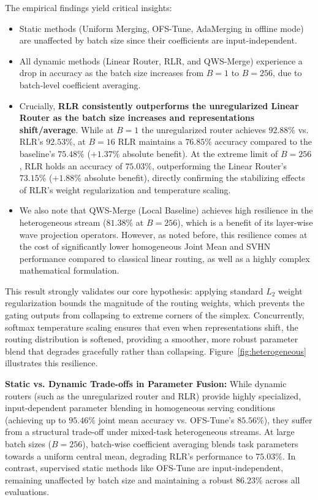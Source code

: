 The empirical findings yield critical insights:
\begin{itemize}
    \item Static methods (Uniform Merging, OFS-Tune, AdaMerging in offline mode) are unaffected by batch size since their coefficients are input-independent.
    \item All dynamic methods (Linear Router, RLR, and QWS-Merge) experience a drop in accuracy as the batch size increases from $B=1$ to $B=256$, due to batch-level coefficient averaging.
    \item Crucially, \textbf{RLR consistently outperforms the unregularized Linear Router as the batch size increases and representations shift/average}. While at $B=1$ the unregularized router achieves $92.88\%$ vs. RLR's $92.53\%$, at $B=16$ RLR maintains a $76.85\%$ accuracy compared to the baseline's $75.48\%$ ($+1.37\%$ absolute benefit). At the extreme limit of $B=256$, RLR holds an accuracy of $75.03\%$, outperforming the Linear Router's $73.15\%$ ($+1.88\%$ absolute benefit), directly confirming the stabilizing effects of RLR's weight regularization and temperature scaling.
    \item We also note that QWS-Merge (Local Baseline) achieves high resilience in the heterogeneous stream ($81.38\%$ at $B=256$), which is a benefit of its layer-wise wave projection operators. However, as noted before, this resilience comes at the cost of significantly lower homogeneous Joint Mean and SVHN performance compared to classical linear routing, as well as a highly complex mathematical formulation.
\end{itemize}

This result strongly validates our core hypothesis: applying standard $L_2$ weight regularization bounds the magnitude of the routing weights, which prevents the gating outputs from collapsing to extreme corners of the simplex. Concurrently, softmax temperature scaling ensures that even when representations shift, the routing distribution is softened, providing a smoother, more robust parameter blend that degrades gracefully rather than collapsing. Figure~\ref{fig:heterogeneous} illustrates this resilience.

\textbf{Static vs. Dynamic Trade-offs in Parameter Fusion:} While dynamic routers (such as the unregularized router and RLR) provide highly specialized, input-dependent parameter blending in homogeneous serving conditions (achieving up to $95.46\%$ joint mean accuracy vs. OFS-Tune's $85.56\%$), they suffer from a structural trade-off under mixed-task heterogeneous streams. At large batch sizes ($B=256$), batch-wise coefficient averaging blends task parameters towards a uniform central mean, degrading RLR's performance to $75.03\%$. In contrast, supervised static methods like OFS-Tune are input-independent, remaining unaffected by batch size and maintaining a robust $86.23\%$ across all evaluations. 

